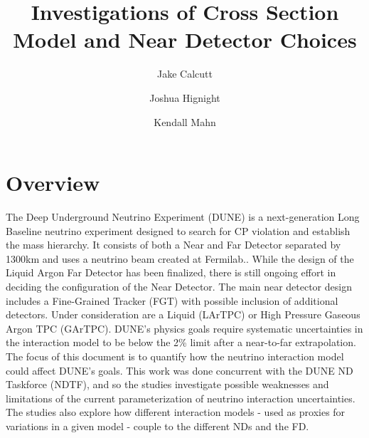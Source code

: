\documentclass[12pt]{article}
\title{Investigations of Cross Section Model and Near Detector Choices}
\date{}
\begin{document}
\author[1]{Jake Calcutt}
\author[1]{Joshua Hignight}
\author[1]{Kendall Mahn}


\maketitle
\thispagestyle{fancy}

\section{Overview}\label{sec:view}


The Deep Underground Neutrino Experiment (DUNE) is a next-generation Long Baseline neutrino experiment designed to search for CP violation and establish the mass hierarchy. It consists of both a Near and Far Detector separated by 1300km and uses a neutrino beam created at Fermilab.\cite{DUNE_CDR1}. While the design of the Liquid Argon Far Detector has been finalized, there is still ongoing effort in deciding the configuration of the Near Detector. The main near detector design includes a Fine-Grained Tracker (FGT) with possible inclusion of additional detectors. Under consideration are a Liquid (LArTPC) or High Pressure Gaseous Argon TPC (GArTPC). DUNE's physics goals require systematic uncertainties in the interaction model to be below the 2\% limit after a near-to-far extrapolation\cite{DUNE_review}. The focus of this document is to quantify how the neutrino interaction model could affect DUNE's goals. This work was done concurrent with the DUNE ND Taskforce (NDTF), and so the studies investigate possible weaknesses and limitations of the current parameterization of neutrino interaction uncertainties. The studies also explore how different interaction models - used as proxies for variations in a given model - couple to the different NDs and the FD.
\end{document}
